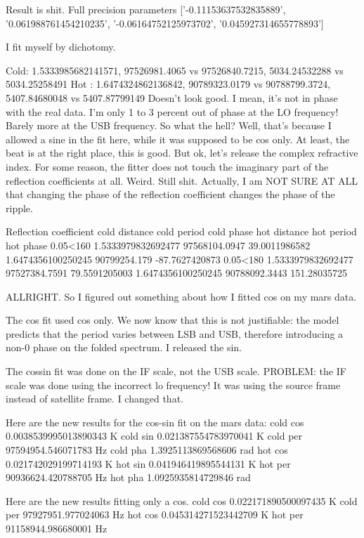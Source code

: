 Result is shit.
Full precision parameters
['-0.11153637532835889', '0.061988761454210235',
'-0.06164752125973702', '0.045927314655778893']

I fit myself by dichotomy.

Cold: 1.5333985682141571, 97526981.4065 vs 97526840.7215, 5034.24532288 vs 5034.25258491
Hot : 1.6474324862136842, 90789323.0179 vs 90788799.3724, 5407.84680048 vs 5407.87799149
Doesn't look good.  I mean, it's not in phase with the real data.
I'm only 1 to 3 percent out of phase at the LO frequency!  Barely more at the USB frequency.  So what the hell?  Well, that's because I allowed a sine in the fit here, while it was supposed to be cos only.  At least, the beat is at the right place, this is good.
But ok, let's release the complex refractive index.
For some reason, the fitter does not touch the imaginary part of the reflection coefficients at all.  Weird.
Still shit.  Actually, I am NOT SURE AT ALL that changing the phase of the reflection coefficient changes the phase of the ripple.

Reflection coefficient    cold distance      cold period   cold phase      hot distance       hot period    hot phase
0.05<160                  1.5333979832692477 97568104.0947 39.0011986582   1.6474356100250245 90799254.179  -87.7627420873
0.05<180                  1.5333979832692477 97527384.7591 79.5591205003   1.6474356100250245 90788092.3443 151.28035725



ALLRIGHT.  So I figured out something about how I fitted cos on my mars data.

The cos fit used cos only.  We now know that this is not justifiable: the model predicts that the period varies between LSB and USB, therefore introducing a non-0 phase on the folded spectrum.  I released the sin.

The cossin fit was done on the IF scale, not the USB scale.  PROBLEM: the IF scale was done using the incorrect lo frequency!  It was using the source frame instead of satellite frame.  I changed that.

Here are the new results for the cos-sin fit on the mars data:
cold cos 0.0038539995013890343 K
cold sin 0.021387554783970041  K
cold per 97594954.546071783    Hz
cold pha 1.3925113869568606    rad
hot  cos 0.021742029199714193  K
hot  sin 0.041946419895544131  K
hot  per 90936624.420788705    Hz
hot  pha 1.0925935814729846    rad

Here are the new results fitting only a cos.
cold cos 0.022171890500097435  K
cold per 97927951.977024063    Hz
hot  cos 0.045314271523442709  K
hot  per 91158944.986680001    Hz

